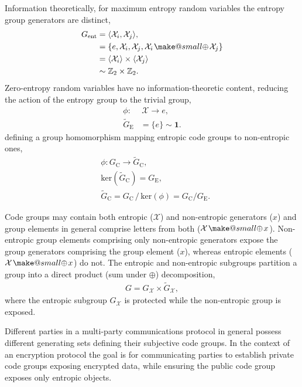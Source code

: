 \documentclass[twocolumn, aps, amsmath, amssymb, nofootinbib, superscriptaddress, longbibliography, doublefloatfix, table-of-contents, eqsecnum, rmp]{revtex4-2}
\makeatletter
\newcommand{\soplus}{{{\hspace{1pt}}{\mathbin{\mathpalette\make@small{\mathbin\oplus}}}}{\hspace{1pt}}}
\newcommand{\make@small}[2]{%
  \vcenter{\hbox{%
    \scalebox{0.6}{$\m@th#1#2$}%
  }}%
}
\makeatother
\begin{document}
Information theoretically, for maximum entropy random variables the entropy group generators are distinct,
\begin{align}
	G_\mathrm{ent} &= \langle \mathcal{X}_i,\mathcal{X}_j\rangle,\nonumber\\
	&= \{e,\mathcal{X}_i,\mathcal{X}_j, \mathcal{X}_i\soplus \mathcal{X}_j\} \nonumber\\
	&= \langle \mathcal{X}_i\rangle \times \langle \mathcal{X}_j\rangle \nonumber\\
	&\sim \mathbb{Z}_2 \times \mathbb{Z}_2.
\end{align}
Zero-entropy random variables have no information-theoretic content, reducing the action of the entropy group to the trivial group,
\begin{align}
	\phi:&\, \mathcal{X} \to e,\nonumber\\
	{\tilde{G}}_\mathrm{E} &= \{e\} \sim \mathbf{1}.
\end{align}
defining a group homomorphism mapping entropic code groups to non-entropic ones,
\begin{align}
	&\phi: G_\mathrm{C} \to {\tilde G}_\mathrm{C},\nonumber\\
	&\mathrm{ker}({\tilde G}_\mathrm{C}) = G_\mathrm{E},\nonumber\\
	&{\tilde G}_\mathrm{C} = G_\mathrm{C} \,/\, \mathrm{ker}(\phi) = G_\mathrm{C} / G_\mathrm{E}.
\end{align}

Code groups may contain both entropic ($\mathcal{X}$) and non-entropic generators ($x$) and group elements in general comprise letters from both ($\mathcal{X}\soplus x$). Non-entropic group elements comprising only non-entropic generators expose the group generators comprising the group element ($x$), whereas entropic elements ($\mathcal{X}\soplus x$) do not. The entropic and non-entropic subgroups partition a group into a direct product (sum under $\oplus$) decomposition,
\begin{align}
	G = G_\mathcal{X} \times \tilde{G}_\mathcal{X},
\end{align}
where the entropic subgroup $G_\mathcal{X}$ is protected while the non-entropic group is exposed.

Different parties in a multi-party communications protocol in general possess different generating sets defining their subjective code groups. In the context of an encryption protocol the goal is for communicating parties to establish private code groups exposing encrypted data, while ensuring the public code group exposes only entropic objects.
\end{document}

